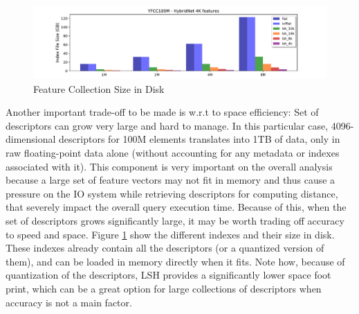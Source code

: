 \begin{figure}[]
\centering
\includegraphics[width=\textwidth]{figures/features_disksize}
\caption{Feature Collection Size in Disk}
\label{fig:features_size_does_matter}
\end{figure}

Another important trade-off to be made is w.r.t to space efficiency: Set of
descriptors can grow very large and hard to manage.
In this particular case, 4096-dimensional descriptors for 100M elements
translates into 1TB of data, only in raw floating-point data alone (without
accounting for any metadata or indexes associated with it).
This component is very important on the overall analysis because a large set
of feature vectors may not fit in memory and thus cause a pressure on the IO
system while retrieving descriptors for computing distance, that severely impact
the overall query execution time.
Because of this, when the set of descriptors grows significantly large,
it may be worth trading off accuracy to speed and space.
Figure \ref{fig:features_size_does_matter} show the different indexes and
their size in disk. These indexes already contain all the descriptors (or
a quantized version of them), and can be loaded in memory directly when it fits.
Note how, because of quantization of the descriptors,
LSH provides a significantly lower space foot print, which can be a great option
for large collections of descriptors when accuracy is not a main factor.

